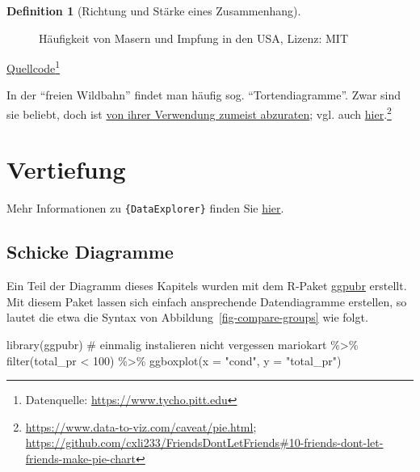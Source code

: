 \documentclass[
  a4paper,
  DIV=11]{scrreprt}
\newenvironment{Shaded}{\begin{snugshade}}{\end{snugshade}}
\newcommand{\AttributeTok}[1]{\textcolor[rgb]{0.40,0.45,0.13}{#1}}
\newcommand{\CommentTok}[1]{\textcolor[rgb]{0.37,0.37,0.37}{#1}}
\newcommand{\DecValTok}[1]{\textcolor[rgb]{0.68,0.00,0.00}{#1}}
\newcommand{\FunctionTok}[1]{\textcolor[rgb]{0.28,0.35,0.67}{#1}}
\newcommand{\NormalTok}[1]{\textcolor[rgb]{0.00,0.23,0.31}{#1}}
\newcommand{\SpecialCharTok}[1]{\textcolor[rgb]{0.37,0.37,0.37}{#1}}
\newcommand{\StringTok}[1]{\textcolor[rgb]{0.13,0.47,0.30}{#1}}
\theoremstyle{definition}
\theoremstyle{definition}
\theoremstyle{definition}
\newtheorem{definition}{Definition}[chapter]
\theoremstyle{remark}
\begin{document}
\begin{definition}[Richtung und Stärke eines
Zusammenhang]
\begin{figure}
\caption{\label{fig-vaccine}Häufigkeit von Masern und Impfung in den
USA, Lizenz: MIT}

\end{figure}%

\href{https://github.com/blmoore/blogR/blob/master/R/measles_incidence_heatmap.R}{Quellcode}\footnote{Datenquelle:
  \url{https://www.tycho.pitt.edu}}

In der ``freien Wildbahn'' findet man häufig sog. ``Tortendiagramme''.
Zwar sind sie beliebt, doch ist
\href{https://www.data-to-viz.com/caveat/pie.html}{von ihrer Verwendung
zumeist abzuraten}; vgl. auch
\href{https://github.com/cxli233/FriendsDontLetFriends\#10-friends-dont-let-friends-make-pie-chart}{hier}.\footnote{\url{https://www.data-to-viz.com/caveat/pie.html};
  \url{https://github.com/cxli233/FriendsDontLetFriends\#10-friends-dont-let-friends-make-pie-chart}}

\section{Vertiefung}\label{vertiefung-4}

Mehr Informationen zu \texttt{\{DataExplorer\}} finden Sie
\href{https://boxuancui.github.io/DataExplorer/index.html}{hier}.

\subsection{Schicke Diagramme}\label{schicke-diagramme}

Ein Teil der Diagramm dieses Kapitels wurden mit dem R-Paket
\href{https://rpkgs.datanovia.com/ggpubr/}{ggpubr} erstellt. Mit diesem
Paket lassen sich einfach ansprechende Datendiagramme erstellen, so
lautet die etwa die Syntax von Abbildung~\ref{fig-compare-groups} wie
folgt.

\begin{Shaded}
\begin{Highlighting}[]
\FunctionTok{library}\NormalTok{(ggpubr)  }\CommentTok{\# einmalig instalieren nicht vergessen}
\NormalTok{mariokart }\SpecialCharTok{\%\textgreater{}\%} 
  \FunctionTok{filter}\NormalTok{(total\_pr }\SpecialCharTok{\textless{}} \DecValTok{100}\NormalTok{) }\SpecialCharTok{\%\textgreater{}\%} 
  \FunctionTok{ggboxplot}\NormalTok{(}\AttributeTok{x =} \StringTok{"cond"}\NormalTok{, }\AttributeTok{y =} \StringTok{"total\_pr"}\NormalTok{)}
\end{Highlighting}
\end{Shaded}


\end{definition}
\end{document}
